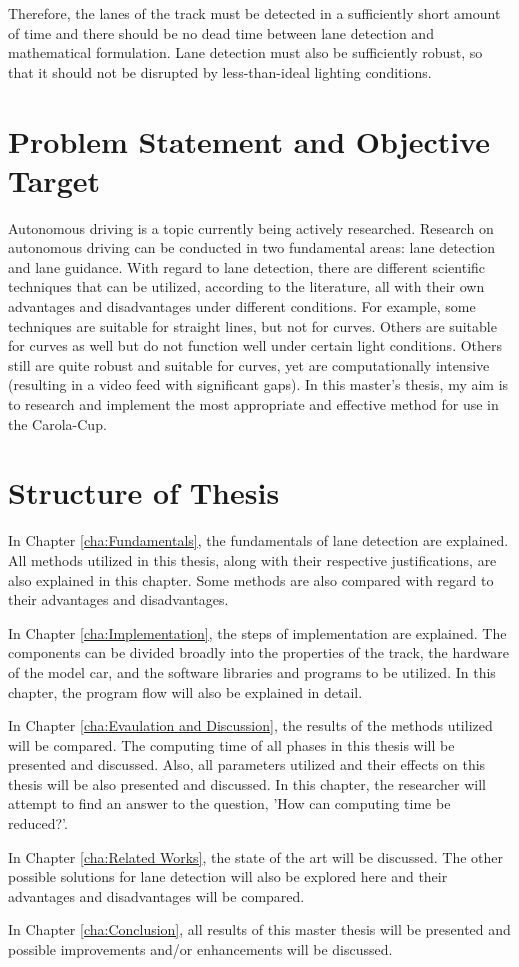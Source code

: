 Therefore, the lanes of the track must be detected in a sufficiently short amount of time and there should be no dead time between lane detection and mathematical 
formulation. Lane detection must also be sufficiently robust, so that it should not be disrupted by less-than-ideal lighting conditions.

\section{Problem Statement and Objective Target}\label{sec:Problem Statement and Objective Target}


Autonomous driving is a topic currently being actively researched. Research on 
autonomous driving can be conducted in two fundamental areas: lane detection and lane guidance. With regard to lane detection, there are different scientific techniques that can be utilized, according to the literature, all with their own advantages and disadvantages under different conditions. For example, some techniques are suitable for straight lines, but not for curves. Others are suitable for curves as well but do not function well under certain light conditions. Others still are quite robust and suitable for curves, yet are computationally intensive (resulting in a video feed with significant gaps). In this master's thesis, my aim is to research and implement the most appropriate and effective method for use in the Carola-Cup.

\section{Structure of Thesis}\label{sec:Structure of Thesis}


In Chapter \ref{cha:Fundamentals}, the fundamentals of lane detection are explained. All methods utilized in this thesis, along with their respective justifications, are also explained in this chapter. Some methods are also compared with regard to their advantages and disadvantages.


In Chapter \ref{cha:Implementation}, the steps of implementation are explained. The 
components can be divided broadly into the properties of the track, the hardware of the model car, and the software libraries and programs to be utilized. In this chapter, the program flow will also be explained in detail.

In Chapter \ref{cha:Evaulation and Discussion}, the results of the methods utilized will be compared. The computing time of all phases in this thesis will be presented and discussed. Also, all parameters utilized and their effects on this thesis will be also presented and discussed. In this chapter, the researcher will attempt to find an answer to the question, 'How can computing time be reduced?'.

In Chapter \ref{cha:Related Works}, the state of the art will be discussed. The other possible solutions for lane detection will also be explored here and their advantages and disadvantages will be compared.

In Chapter \ref{cha:Conclusion}, all results of this master thesis will be presented and possible improvements and/or enhancements will be discussed.


